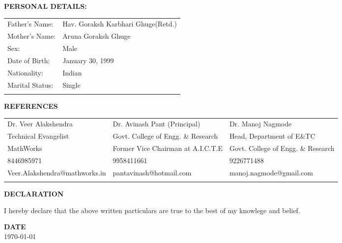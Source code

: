 \documentclass[a4paper, 10pt]{article}
\begin{document}
{\textbf{\Large{PERSONAL DETAILS:}}}\\

\begin{tabular}{ p{3cm} p{7cm} }
Father's Name: & Hav$.$ Goraksh Karbhari Ghuge(Retd.) \\ 
Mother's Name: & Aruna Goraksh Ghuge\\      
Sex: & Male \\      
Date of Birth: & January 30, 1999\\ 
Nationality: & Indian \\
Marital Status: & Single \\ 
\\
\end{tabular}

{\textbf{\Large{REFERENCES}}}\\

\begin{tabular}{ p{5cm} p{5.5cm} p{5.5cm} }
Dr$.$ Veer Alakshendra & Dr$.$ Avinash Pant (Principal) & Dr$.$ Manoj Nagmode\\ 
Technical Evangelist & Govt$.$ College of Engg$.$ \& Research & Head, Department of E\&TC \\      
MathWorks & Former Vice Chairman at A.I.C.T.E & Govt$.$ College of Engg$.$ \& Research \\      
8446985971 & 9958411661 & 9226771488 \\ 
Veer.Alakshendra@mathworks.in & pantavinash@hotmail.com & manoj.nagmode@gmail.com \\
\\
\end{tabular}

{\textbf{\Large{DECLARATION}}}\\

\centerline{I hereby declare that the above written particulars are true to the best of my knowlege and belief.}

\vspace{0.4cm}
{\textbf{\Large{DATE}}}\\

\today
\end{document}

